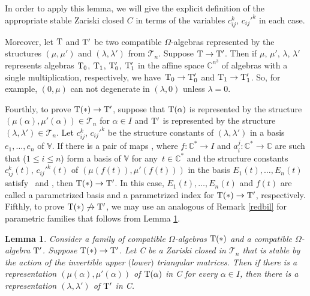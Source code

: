 \documentclass[10pt,a4paper]{amsart}
\numberwithin{equation}{section}
\newtheorem{Lemma}[Theorem]{Lemma}
\begin{document}
In order to apply this lemma, we will give the explicit definition of the appropriate stable Zariski closed $C$ in terms of the variables $c_{ij}^k$, $c_{ij}'^k$ in each case.

\begin{Remark}\label{redbil}
Moreover, let ${{\rm T} }$ and ${{\rm T} }'$ be two compatible $\Omega$-algebras represented by the structures $(\mu, \mu')$ and $(\lambda, \lambda')$ from ${\mathcal{T}_{n}}$. Suppose ${\rm T}\to{\rm T}'$. Then if $\mu$, $\mu'$, $\lambda$, $\lambda'$ represents algebras ${\rm T}_{0}$, ${\rm T}_{1}$, ${\rm T}'_{0}$, ${\rm T}'_{1}$ in the affine space $\mathbb{C}^{n^3}$ of algebras with a single multiplication, respectively, we have~${{\rm T}_{0}\to {\rm T}'_{0}}$ and $ {\rm T}_{1}\to {\rm T}'_{1}$.
So, for example, $(0, \mu)$ can not degenerate in $(\lambda, 0)$ unless $\lambda=0$.
\end{Remark}

Fourthly, to prove ${{\rm T} }(*)\to {{\rm T} }'$, suppose that ${{\rm T} }(\alpha)$ is represented by the structure $(\mu(\alpha),\mu'(\alpha))\allowbreak\in{\mathcal{T} }_n$ for $\alpha\in I$ and ${{\rm T} }'$ is represented by the structure $(\lambda, \lambda')\in{\mathcal{T} }_n$. Let $c_{ij}^k$, $c_{ij}'^k$ be the structure constants of $(\lambda, \lambda')$ in a basis $e_1,\dots, e_n$ of ${\mathbb V}$. If there is a pair of maps , where $f\colon \mathbb{C}^*\to I$ and $a_i^j\colon\mathbb{C}^*\to \mathbb{C}$ are such that  ($1\le i\le n$) form a basis of ${\mathbb V}$ for any~${t\in\mathbb{C}^*}$ and the structure constants $c_{ij}^k(t)$, $c_{ij}'^k(t)$ of $(\mu(f(t)),\mu'(f(t)))$ in the basis $E_1(t),\dots, E_n(t)$ satisfy~ and , then ${{\rm T} }(*)\to {{\rm T} }'$. In this case, $E_1(t),\dots, E_n(t)$ and $f(t)$ are called a parametrized basis and a parametrized index for ${{\rm T} }(*)\to {{\rm T} }'$, respectively.
Fifthly, to prove ${{\rm T} }(*)\not \to {{\rm T} }'$, we may use an analogous of Remark \ref{redbil} for parametric families that follows from Lemma \ref{main2}.

\begin{Lemma}\label{main2}
Consider a family of compatible $\Omega$-algebras ${\rm T}(*)$ and a compatible $\Omega$-algebra ${\rm T}'$. Suppose ${\rm T}(*) \to {\rm T}'$. Let C be a Zariski closed in $\mathcal{T}_n$ that is stable by the action of the invertible upper $($lower$)$ triangular matrices. Then if there is a representation $(\mu(\alpha), \mu'(\alpha))$ of ${\rm T}(\alpha)$ in C for every $\alpha\in I$, then there is a representation $(\lambda, \lambda')$ of ${\rm T}'$ in C.
\end{Lemma}
\end{document}
